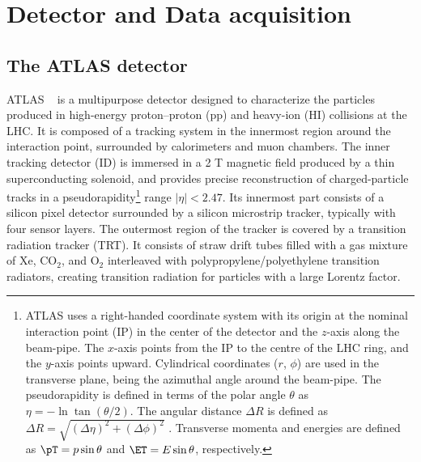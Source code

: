 
\section{Detector and Data acquisition}\label{sec:atlas}
%
%



\subsection{The ATLAS detector}\label{subsec:atlas_detector}

ATLAS  ~\cite{PERF-2007-01,ATLAS-TDR-19,PIX-2018-001} is a multipurpose detector designed to characterize the particles produced in high-energy proton–proton (pp) and heavy-ion (HI) collisions at the LHC. It is composed of a tracking system in the innermost region around the interaction point, surrounded by calorimeters and muon chambers. The inner tracking detector (ID) is immersed in a 2 T magnetic field produced by a thin superconducting
solenoid, and provides precise reconstruction of charged-particle tracks in a pseudorapidity\footnote{ATLAS uses a right-handed coordinate system with its origin at the nominal interaction point (IP) in the center of the detector and the $z$-axis along the beam-pipe. The $x$-axis points from the IP to the centre of the LHC ring, and the $y$-axis points upward. Cylindrical coordinates ($r$, $\phi$) are used in the transverse plane, \phi being the azimuthal angle around the beam-pipe. The pseudorapidity is defined in terms of the polar angle $\theta$ as $\eta = -\ln{\tan(\theta/2)}$. The angular distance $\Delta R$ is defined as $\Delta R = \sqrt{(\Delta\eta)^{2} + (\Delta\phi)^{2}}$ . Transverse momenta and energies are defined as $\pT = p\sin\theta$ and $\ET = E\sin\theta$, respectively.} range $|\eta|<2.47$. Its innermost part consists of a silicon pixel detector surrounded by a silicon microstrip tracker, typically with four sensor layers. The outermost region of the tracker is covered by a transition radiation tracker (TRT). It consists of 
straw drift tubes filled with a gas mixture of Xe, CO$_2$, and O$_2$
interleaved with polypropylene/polyethylene transition radiators,  creating transition radiation for particles with a large Lorentz factor.

